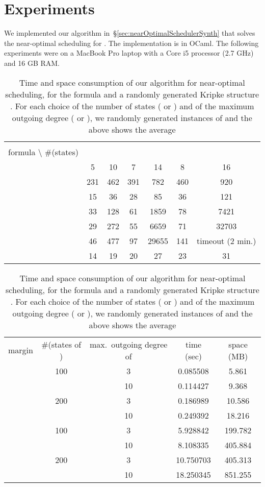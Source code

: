 \documentclass[a4paper,USenglish,numberwithinsect]{lipics}
\theoremstyle{definition}
\theoremstyle{remark}
\theoremstyle{plain}
\begin{document}
\section{Experiments}\label{sec:experiments}
We implemented our algorithm
in~\S{}\ref{sec:nearOptimalSchedulerSynth} that solves the near-optimal
scheduling for . The implementation is
in OCaml.
The following  experiments were on
a MacBook Pro laptop
 with a Core i5 processor (2.7 GHz) and 16 GB RAM. 
\begin{table}[tb]
\scriptsize
\begingroup
\renewcommand{\arraystretch}{1.5}
\begin{tabular}{c|c|c|c|c|c|c}& \multicolumn{2}{c|}{} & \multicolumn{2}{c|}{} & \multicolumn{2}{c}{} \\ \cline{2-7}
formula  \textbackslash\; \#(states) & \multicolumn{1}{c|}{} & \multicolumn{1}{c|}{} & \multicolumn{1}{c|}{} & \multicolumn{1}{c|}{} & \multicolumn{1}{c|}{} & \multicolumn{1}{c}{} 
 \\ \hhline{=|=|=|=|=|=|=}

 & 5 & 10 & 7 & 14 & 8 & 16 \\ \hline

 & 231 & 462 & 391 & 782 & 460 & 920 \\ \hline
 & 15 & 36 & 28 & 85 & 36 & 121
\\ \hline\hline

 & 33 & 128 & 61 & 1859 & 78 & 7421 \\ \hline

 & 29 & 272 & 55 & 6659 & 71 & 32703 \\ \hline

 & 46 & 477 & 97 & 29655 & 141 & timeout (2 min.) \\ \hline\hline
 & 14 & 19 & 20 & 27 & 23 & 31
\end{tabular}
\endgroup
\caption{Size of the alternating -acceptance automaton , and -acceptance automaton }
\label{table:numberOfStates}


\begingroup
\renewcommand{\arraystretch}{1.5}
\begin{tabular}{c|c|c|c|c}margin  & \#(states of ) & max.\ outgoing degree of  & 
 time (sec)  &  space (MB) \\ \hhline{=====}
  & 100 & 3 & 0.085508 & 5.861 \\ \cline{3-5}
  &  & 10 & 0.114427 & 9.368 \\ \cline{2-5}
  & 200 & 3 & 0.186989 & 10.586 \\ \cline{3-5}
  &  & 10 & 0.249392 & 18.216 \\ \cline{1-5}
  & 100 & 3 & 5.928842 & 199.782 \\ \cline{3-5}
  & & 10 & 8.108335 & 405.884 \\ \cline{2-5}
 & 200 & 3 & 10.750703 & 405.313 \\ \cline{3-5}
 &  & 10 & 18.250345 & 851.255 
\end{tabular}
\endgroup
\caption{Time and space consumption of our algorithm for near-optimal scheduling, for the formula  and a randomly generated
 Kripke structure . For each choice of the number of states ( or ) and of
 the maximum outgoing degree ( or ), we randomly generated 
 instances of  and the above shows the average}
\label{table:timeSpaceConsumption}
 

\end{table}
\end{document}
